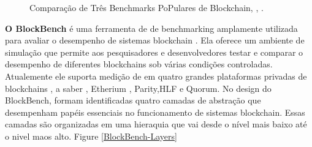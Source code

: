 \begin{figure} [H]
\centering
{}
\caption{Comparação de Três Benchmarks PoPulares de Blockchain, \cite{9129732}, .}
\label{Blockchain-Comparison}
\end{figure}
\textbf{O BlockBench} é uma ferramenta de de benchmarking amplamente utilizada para avaliar o desempenho de sistemas blockchain . Ela oferece um ambiente de simulação que permite aos pesquisadores e desenvolvedores testar e comparar o desempenho de diferentes blockchains sob várias condições controladas. Atualemente ele suporta medição de em quatro grandes plataformas privadas de blockchains , a saber , Etherium , Parity,HLF e Quorum.
No design do BlockBench, formam identificadas quatro camadas de abstração que desempenham papéis essenciais no funcionamento de sistemas blockchain. Essas camadas são organizadas em uma hieraquia que vai desde o nível mais baixo até o nivel maos alto. Figure \ref{BlockBench-Layers}

